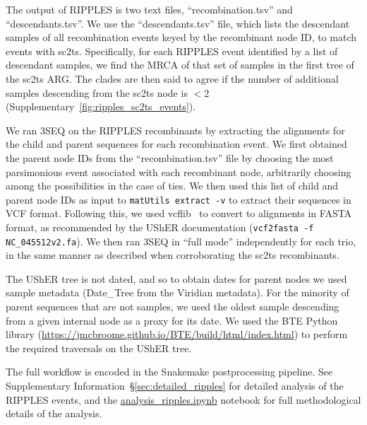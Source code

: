 \documentclass[12pt]{article}
\newcommand{\supref}[1]{Supplementary Information~\S\ref{#1}}
\newcommand{\siref}[1]{Supplementary~\ref{#1}}
\begin{document}
The output of RIPPLES is two text files, ``recombination.tsv''
and ``descendants.tsv''. We use the ``descendants.tsv'' file,
which lists the descendant samples of all recombination events
keyed by the recombinant node ID, to match events with sc2ts.
Specifically, for each RIPPLES event identified by a list of
descendant samples, we find the MRCA of
that set of samples in the first tree of the sc2ts ARG.
The clades are then said to agree if the number of additional
samples descending from the sc2ts node is $<2$
(\siref{fig:ripples_sc2ts_events}).

We ran 3SEQ on the RIPPLES recombinants by extracting the
alignments for the child and parent sequences for each
recombination event. We first obtained the parent
node IDs from the ``recombination.tsv'' file by choosing
the most parsimonious event associated with each recombinant
node,  arbitrarily choosing among the possibilities in
the case of ties. We then used this list of child and
parent node IDs as
input to \texttt{matUtils extract -v} to extract their
sequences in VCF format. Following this,
we used vcflib~\cite{Garrison2022spectrum} to convert
to alignments in FASTA format, as recommended by
the UShER documentation (\texttt{vcf2fasta -f NC\_045512v2.fa}).
We then ran 3SEQ in ``full mode''
independently for each trio, in the same manner as described
when corroborating the sc2ts recombinants.

The UShER tree is not dated, and so to obtain dates for
parent nodes we used sample metadata
(Date\_Tree from the Viridian metadata). For the minority
of parent sequences that are not samples, we used the oldest
sample descending from a given internal node as a proxy for
its date. We used the BTE Python library
(\url{https://jmcbroome.github.io/BTE/build/html/index.html})
to perform the required traversals on the UShER tree.

The full workflow is encoded in the Snakemake postprocessing
pipeline.
See \supref{sec:detailed_ripples} for detailed analysis
of the RIPPLES events,
and the
\href{https://github.com/jeromekelleher/sc2ts-paper/blob/main/notebooks/analysis\_ripples.ipynb}{analysis\_ripples.ipynb}
notebook for full methodological details of the analysis.
\end{document}
